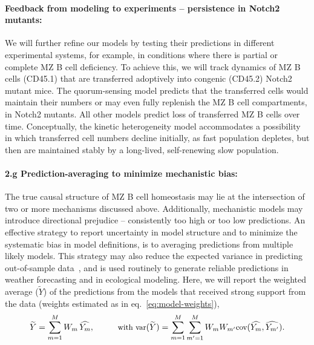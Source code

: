 \documentclass[11pt]{article}
\newcommand{\para}[1]{\vspace*{-4.5mm}\paragraph{#1}}
\begin{document}


\para{{Feedback from modeling to experiments -- persistence in Notch2 mutants:}}
We will further refine our models by testing their predictions in different experimental systems, for example, in conditions where there is partial or complete MZ B cell deficiency.
To achieve this, we will track dynamics of MZ B cells (CD45.1) that are transferred adoptively into congenic (CD45.2)  Notch2 mutant mice. %
The quorum-sensing model predicts that the transferred cells would maintain their numbers or may even fully replenish the MZ B cell compartments, in Notch2 mutants.
All other models predict loss of transferred MZ B cells over time.
Conceptually, the kinetic heterogeneity model accommodates a possibility in which transferred cell numbers decline initially, as fast population depletes, but then are maintained stably by a long-lived, self-renewing slow population.


\para{2.g Prediction-averaging to minimize  mechanistic bias:}
The true causal structure of MZ B cell homeostasis may lie at the intersection of two or more mechanisms discussed above.
Additionally, mechanistic models may introduce directional prejudice -- consistently too high or too low predictions. 
An effective strategy to report uncertainty in model structure and to minimize the systematic bias in model definitions, is to averaging predictions from multiple likely models. 
This strategy may also reduce the expected variance in predicting out-of-sample data~\cite{Wintle:2003, Dormann:2018}, and is used routinely to generate reliable predictions  in weather forecasting and in ecological modeling.
Here, we will report the weighted average ($\widetilde{Y}$) of the predictions from the models that received strong support from the data (weights estimated as in eq.~\ref{eq:model-weights}),
\vspace{-1mm}
\begin{equation} \small
\widetilde{Y} = \sum_{m=1}^{M} W_{m} \, \widehat{Y_{m}}, \quad \quad  \quad
\text{with } \text{var}(\widetilde{Y}) =  \sum_{m=1}^{M} \sum_{m'=1}^{M} W_{m} W_{m'} \text{cov}(\widehat{Y_{m}}, \widehat{Y_{m'}}).
\label{eq:model-averaging}
\vspace{-2mm}
\end{equation}
\end{document}
